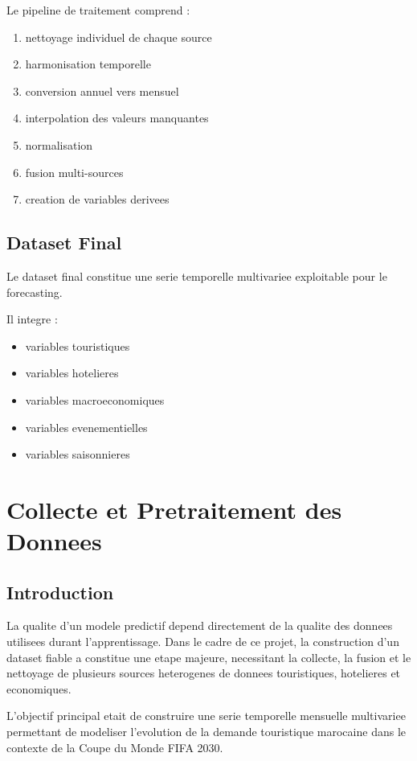 \documentclass[12pt,a4paper]{report}
\begin{document}
Le pipeline de traitement comprend :

\begin{enumerate}
    \item nettoyage individuel de chaque source
    \item harmonisation temporelle
    \item conversion annuel vers mensuel
    \item interpolation des valeurs manquantes
    \item normalisation
    \item fusion multi-sources
    \item creation de variables derivees
\end{enumerate}

\section{Dataset Final}

Le dataset final constitue une serie temporelle multivariee exploitable
pour le forecasting.

Il integre :

\begin{itemize}
    \item variables touristiques
    \item variables hotelieres
    \item variables macroeconomiques
    \item variables evenementielles
    \item variables saisonnieres
\end{itemize}

\chapter{Collecte et Pretraitement des Donnees}

\section{Introduction}

La qualite d'un modele predictif depend directement de la qualite des
donnees utilisees durant l'apprentissage. Dans le cadre de ce projet,
la construction d'un dataset fiable a constitue une etape majeure,
necessitant la collecte, la fusion et le nettoyage de plusieurs sources
heterogenes de donnees touristiques, hotelieres et economiques.

L'objectif principal etait de construire une serie temporelle mensuelle
multivariee permettant de modeliser l'evolution de la demande touristique
marocaine dans le contexte de la Coupe du Monde FIFA 2030.
\end{document}
